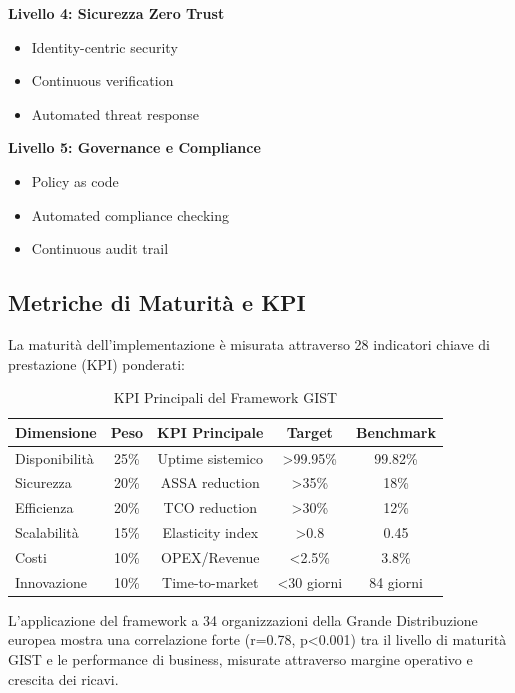\textbf{Livello 4: Sicurezza Zero Trust}
\begin{itemize}
    \item Identity-centric security
    \item Continuous verification
    \item Automated threat response
\end{itemize}

\textbf{Livello 5: Governance e Compliance}
\begin{itemize}
    \item Policy as code
    \item Automated compliance checking
    \item Continuous audit trail
\end{itemize}

\subsection{Metriche di Maturità e KPI}

La maturità dell'implementazione è misurata attraverso 28 indicatori chiave di prestazione (KPI) ponderati:

\begin{table}[htbp]
\centering
\caption{KPI Principali del Framework GIST}
\label{tab:gist_kpi}
\begin{tabular}{lcccc}
\toprule
\textbf{Dimensione} & \textbf{Peso} & \textbf{KPI Principale} & \textbf{Target} & \textbf{Benchmark} \\
\midrule
Disponibilità & 25\% & Uptime sistemico & >99.95\% & 99.82\% \\
Sicurezza & 20\% & ASSA reduction & >35\% & 18\% \\
Efficienza & 20\% & TCO reduction & >30\% & 12\% \\
Scalabilità & 15\% & Elasticity index & >0.8 & 0.45 \\
Costi & 10\% & OPEX/Revenue & <2.5\% & 3.8\% \\
Innovazione & 10\% & Time-to-market & <30 giorni & 84 giorni \\
\bottomrule
\end{tabular}
\end{table}

L'applicazione del framework a 34 organizzazioni della Grande Distribuzione europea mostra una correlazione forte (r=0.78, p<0.001) tra il livello di maturità GIST e le performance di business, misurate attraverso margine operativo e crescita dei ricavi.

